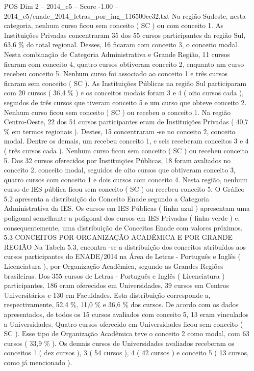 \begin{textsample}{POS Dim 2 – 2014\_c5 – Score -1.00 – 2014\_c5/enade\_2014\_letras\_por\_ing\_116500ce32.txt}
Na região Sudeste, nesta categoria, nenhum curso ficou sem conceito ( SC ) ou com conceito 1.
As Instituições Privadas concentraram 35 dos 55 cursos participantes da região Sul, 63,6 \% do total regional.
Desses, 16 ficaram com conceito 3, o conceito modal.
Nesta combinação de Categoria Administrativa e Grande Região, 11 cursos ficaram com conceito 4, quatro cursos obtiveram conceito 2, enquanto um curso recebeu conceito 5.
Nenhum curso foi associado ao conceito 1 e três cursos ficaram sem conceito ( SC ).
As Instituições Públicas na região Sul participaram com 20 cursos ( 36,4 \% ) e os conceitos modais foram 3 e 4 ( oito cursos cada ), seguidos de três cursos que tiveram conceito 5 e um curso que obteve conceito 2.
Nenhum curso ficou sem conceito ( SC ) ou recebeu o conceito 1.
Na região Centro-Oeste, 22 dos 54 cursos participantes eram de Instituições Privadas ( 40,7 \% em termos regionais ).
Destes, 15 concentraram -se no conceito 2, conceito modal.
Dentre os demais, um recebeu conceito 1, e seis receberam conceitos 3 e 4 ( três cursos cada ).
Nenhum curso ficou sem conceito ( SC ) ou recebeu conceito 5.
Dos 32 cursos oferecidos por Instituições Públicas, 18 foram avaliados no conceito 2, conceito modal, seguidos de oito cursos que obtiveram conceito 3, quatro cursos com conceito 1 e dois cursos com conceito 4.
Nesta região, nenhum curso de IES pública ficou sem conceito ( SC ) ou recebeu conceito 5.
O Gráfico 5.2 apresenta a distribuição do Conceito Enade segundo a Categoria Administrativa da IES.
Os cursos em IES Públicas ( linha azul ) apresentam uma poligonal semelhante a poligonal dos cursos em IES Privadas ( linha verde ) e, consequentemente, uma distribuição de Conceitos Enade com valores próximos. 5.3 CONCEITOS POR ORGANIZAÇÃO ACADÊMICA E POR GRANDE REGIÃO Na Tabela 5.3, encontra -se a distribuição dos conceitos atribuídos aos cursos participantes do ENADE/2014 na Área de Letras - Português e Inglês ( Licenciatura ), por Organização Acadêmica, segundo as Grandes Regiões brasileiras.
Dos 355 cursos de Letras - Português e Inglês ( Licenciatura ) participantes, 186 eram oferecidos em Universidades, 39 cursos em Centros Universitários e 130 em Faculdades.
Esta distribuição corresponde a, respectivamente, 52,4 \%, 11,0 \% e 36,6 \% dos cursos.
De acordo com os dados apresentados, de todos os 15 cursos avaliados com conceito 5, 13 eram vinculados a Universidades.
Quatro cursos oferecido em Universidades ficou sem conceito ( SC ).
Esse tipo de Organização Acadêmica teve o conceito 2 como modal, com 63 cursos ( 33,9 \% ).
Os demais cursos de Universidades avaliados receberam os conceitos 1 ( dez cursos ), 3 ( 54 cursos ), 4 ( 42 cursos ) e conceito 5 ( 13 cursos, como já mencionado ).

\end{textsample}
